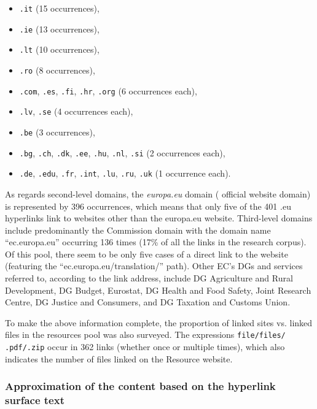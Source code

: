 \documentclass[output=paper]{langsci/langscibook}
\begin{document}
\begin{itemize}
 \item \texttt{.it} (15 occurrences),
\item \texttt{.ie} (13 occurrences),
\item \texttt{.lt} (10 occurrences),
\item \texttt{.ro} (8 occurrences),
\item \texttt{.com}, \texttt{.es}, \texttt{.fi}, \texttt{.hr}, \texttt{.org} (6 occurrences each),
\item \texttt{.lv}, \texttt{.se} (4 occurrences each),
\item \texttt{.be} (3 occurrences),
\item \texttt{.bg}, \texttt{.ch}, \texttt{.dk}, \texttt{.ee}, \texttt{.hu}, \texttt{.nl}, \texttt{.si} (2 occurrences each),
\item \texttt{.de}, \texttt{.edu}, \texttt{.fr}, \texttt{.int}, \texttt{.lu}, \texttt{.ru}, \texttt{.uk} (1 occurrence each).

\end{itemize}

As regards second-level domains, the \textit{europa.eu} domain ( official website domain) is represented by 396 occurrences, which means that only five of the 401 .eu hyperlinks link to websites other than the europa.eu website. Third-level domains include predominantly the  Commission domain with the domain name “ec.europa.eu” occurring 136 times (17\% of all the links in the research corpus). Of this pool, there seem to be only five cases of a direct link to the  website (featuring the “ec.europa.eu/translation/” path). Other EC’s DGs and services referred to, according to the link address, include DG Agriculture and Rural Development, DG Budget, Eurostat, DG Health and Food Safety, Joint Research Centre, DG Justice and Consumers, and DG Taxation and Customs Union.

To make the above information complete, the proportion of linked sites vs. linked files in the resources pool was also surveyed. The expressions \texttt{file/files/ .pdf/.zip} occur in 362 links (whether once or multiple times), which also indicates the number of files linked on the Resource website. 

\subsubsection{Approximation of the content based on the hyperlink surface text}\label{sec:svoboda:4.4.2}
\end{document}
